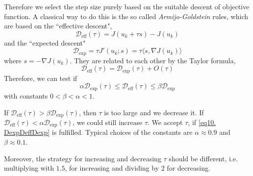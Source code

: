 Therefore we select the step size purely based on the suitable descent of objective function. A classical way to do this is the so called \textit{Armijo-Goldstein} rules, which are based on the ``effective descent",
\[
\mathcal{D}_{\text{eff}}(\tau) = J(u_k+\tau s)-J(u_k)
\]
and the ``expected descent"
\[
	\mathcal{D}_{\text{exp}} = \tau J'(u_k;s)=\tau \langle s, \nabla J(u_k)\rangle
\]
where  $s=-\nabla J(u_k)$. They are related to each other by the Taylor formula,
\[
	\mathcal{D}_{\text{eff}}(\tau)=\mathcal{D}_{\text{exp}}(\tau)+O(\tau)
\]
Therefore, we can test if 
\begin{equation}
\alpha \mathcal{D}_{\text{exp}}(\tau)\leq \mathcal{D}_{\text{eff}}(\tau) \leq \beta \mathcal{D}_{\text{exp}} \label{eq10. DexpDeffDexp} \tag{*}
\end{equation}
with constants $0<\beta<\alpha<1$. 

If $\mathcal{D}_{\text{eff}}(\tau) > \beta \mathcal{D}_{\text{exp}}(\tau)$, then $\tau$ is too large and we decrease it. 
If $\mathcal{D}_{\text{eff}}(\tau)<\alpha\mathcal{D}_{\text{exp}}(\tau)$, we could still increase $\tau$. We accept $\tau$, if 
\eqref{eq10. DexpDeffDexp} is fulfilled. Typical choices of the constants are $\alpha \approx 0.9$ and $\beta \approx 0.1$.

Moreover, the strategy for increasing and decreasing $\tau$ should be different, i.e. multiplying with $1.5$, for increasing and dividing by $2$ for decreasing.

